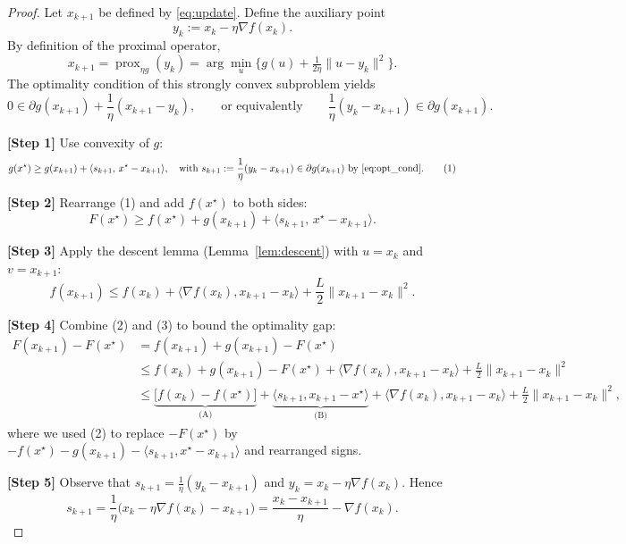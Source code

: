 \documentclass{article}
\newcommand{\prox}{\operatorname{prox}}
\begin{document}
\begin{proof}
Let $x_{k+1}$ be defined by \eqref{eq:update}. Define the auxiliary point
\[
y_{k}:=x_{k}-\eta\nabla f(x_{k}) .
\]
By definition of the proximal operator,
\[
x_{k+1}= \prox_{\eta g}(y_{k}) = \arg\min_{u}\bigl\{ g(u)+\tfrac{1}{2\eta}\|u-y_{k}\|^{2}\bigr\}.
\]
The optimality condition of this strongly convex subproblem yields
\begin{equation}
\label{eq:opt_cond}
0\in \partial g(x_{k+1})+\frac{1}{\eta}(x_{k+1}-y_{k}),
\qquad\text{or equivalently}\qquad
\frac{1}{\eta}(y_{k}-x_{k+1})\in\partial g(x_{k+1}).
\end{equation}

\medskip
\noindent\textbf{[Step 1]}  Use convexity of $g$:
\[
g(x^{\star})\ge g(x_{k+1})+\langle s_{k+1},\,x^{\star}-x_{k+1}\rangle,
\quad\text{with } s_{k+1}:=\frac{1}{\eta}(y_{k}-x_{k+1})\in\partial g(x_{k+1}) \text{ by } \eqref{eq:opt_cond}.
\tag{1}
\]

\noindent\textbf{[Step 2]}  Rearrange (1) and add $f(x^{\star})$ to both sides:
\[
F(x^{\star})\ge f(x^{\star})+g(x_{k+1})+\langle s_{k+1},\,x^{\star}-x_{k+1}\rangle .
\tag{2}
\]

\noindent\textbf{[Step 3]}  Apply the descent lemma (Lemma~\ref{lem:descent}) with $u=x_{k}$ and $v=x_{k+1}$:
\[
f(x_{k+1})\le f(x_{k})+\langle\nabla f(x_{k}),x_{k+1}-x_{k}\rangle+\frac{L}{2}\|x_{k+1}-x_{k}\|^{2}.
\tag{3}
\]

\noindent\textbf{[Step 4]}  Combine (2) and (3) to bound the optimality gap:
\[
\begin{aligned}
F(x_{k+1})-F(x^{\star})
&= f(x_{k+1})+g(x_{k+1})-F(x^{\star})\\
&\le f(x_{k})+g(x_{k+1})-F(x^{\star})
   +\langle\nabla f(x_{k}),x_{k+1}-x_{k}\rangle
   +\frac{L}{2}\|x_{k+1}-x_{k}\|^{2}\\
&\le \underbrace{\bigl[f(x_{k})-f(x^{\star})\bigr]}_{\text{(A)}}
   +\underbrace{\langle s_{k+1},x_{k+1}-x^{\star}\rangle}_{\text{(B)}}
   +\langle\nabla f(x_{k}),x_{k+1}-x_{k}\rangle
   +\frac{L}{2}\|x_{k+1}-x_{k}\|^{2},
\end{aligned}
\tag{4}
\]
where we used (2) to replace $-F(x^{\star})$ by $-f(x^{\star})-g(x_{k+1})-\langle s_{k+1},x^{\star}-x_{k+1}\rangle$ and rearranged signs.

\noindent\textbf{[Step 5]}  Observe that $s_{k+1}=\frac{1}{\eta}(y_{k}-x_{k+1})$ and $y_{k}=x_{k}-\eta\nabla f(x_{k})$. Hence
\[
s_{k+1}= \frac{1}{\eta}\bigl(x_{k}-\eta\nabla f(x_{k})-x_{k+1}\bigr)
       =\frac{x_{k}-x_{k+1}}{\eta}-\nabla f(x_{k}).
\tag{5}
\]


\end{proof}
\end{document}
